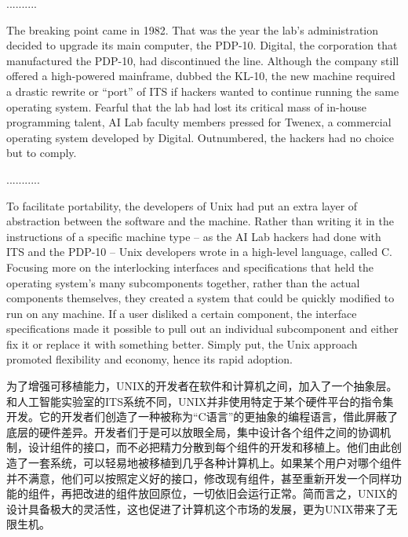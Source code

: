 \ifdefined\chs
..........
\fi

\ifdefined\eng
The breaking point came in 1982. That was the year the lab's administration decided to upgrade its main computer, the PDP-10. Digital, the corporation that manufactured the PDP-10, had discontinued the line. Although the company still offered a high-powered mainframe, dubbed the KL-10, the new machine required a drastic rewrite or ``port'' of ITS if hackers wanted to continue running the same operating system. Fearful that the lab had lost its critical mass of in-house programming talent, AI Lab faculty members pressed for Twenex, a commercial operating system developed by Digital. Outnumbered, the hackers had no choice but to comply.
\fi

\ifdefined\chs
...........
\fi

\fi

\ifdefined\vtwo
\ifdefined\eng
To facilitate portability, the developers of Unix had put an extra layer of abstraction between the software and the machine. Rather than writing it in the instructions of a specific machine type -- as the AI Lab hackers had done with ITS and the PDP-10 -- Unix developers wrote in a high-level language, called C. Focusing more on the interlocking interfaces and specifications that held the operating system's many subcomponents together, rather than the actual components themselves, they created a system that could be quickly modified to run on any machine. If a user disliked a certain component, the interface specifications made it possible to pull out an individual subcomponent and either fix it or replace it with something better. Simply put, the Unix approach promoted flexibility and economy, hence its rapid adoption.
\fi

\ifdefined\chs
为了增强可移植能力，UNIX的开发者在软件和计算机之间，加入了一个抽象层。和人工智能实验室的ITS系统不同，UNIX并非使用特定于某个硬件平台的指令集开发。它的开发者们创造了一种被称为``C语言''的更抽象的编程语言，借此屏蔽了底层的硬件差异。开发者们于是可以放眼全局，集中设计各个组件之间的协调机制，设计组件的接口，而不必把精力分散到每个组件的开发和移植上。他们由此创造了一套系统，可以轻易地被移植到几乎各种计算机上。如果某个用户对哪个组件并不满意，他们可以按照定义好的接口，修改现有组件，甚至重新开发一个同样功能的组件，再把改进的组件放回原位，一切依旧会运行正常。简而言之，UNIX的设计具备极大的灵活性，这也促进了计算机这个市场的发展，更为UNIX带来了无限生机。
\fi

